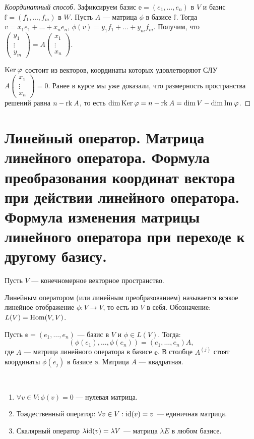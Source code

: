 \begin{proof}[Координатный способ]
    Зафиксируем базис $\mathbb{e} = (e_1, \ldots, e_n)$ в $V$ и базис $\mathbb{f} = (f_1, \ldots, f_m)$ в $W$. Пусть $A$ --- матрица $\phi$ в базисе $\mathbb{f}$. Тогда $v = x_1e_1 + \ldots + x_ne_n$, $\phi(v) = y_1f_1 + \ldots + y_mf_m$. Получим, что $\begin{pmatrix} y_1\\ \vdots \\ y_m \end{pmatrix} = A \begin{pmatrix} x_1\\ \vdots \\ x_n\end{pmatrix}$. 
    
    $\mathrm{Ker}\: \varphi$ состоит из векторов, координаты которых удовлетворяют СЛУ $ A \begin{pmatrix} x_1\\ \vdots \\ x_n\end{pmatrix} = 0$. Ранее в курсе мы уже доказали, что размерность пространства решений равна $n - \mathrm{rk}\: A$, то есть $\dim \mathrm{Ker}\: \varphi = n - \mathrm{rk}\: A = \dim V - \dim \mathrm{Im\:} \varphi$.
\end{proof}

\section{Линейный оператор. Матрица линейного оператора. Формула преобразования координат вектора при действии линейного оператора. Формула изменения матрицы линейного оператора при переходе к другому базису.}

Пусть $V$ --- конечномерное векторное пространство.

\begin{Def}
    Линейным оператором (или линейным преобразованием) называется всякое линейное отображение $\phi \colon V \rightarrow V$, то есть из $V$ в себя. Обозначение: $L(V) = \mathrm{Hom}(V, V)$.
\end{Def}

\par Пусть $\mathbb{e} = (e_1, \ldots, e_n)$ --- базис в $V$ и $\phi \in L(V)$. Тогда:
$$
\left(\phi(e_1), \ldots, \phi(e_n)\right) = \left(e_1, \ldots, e_n\right)A,
$$
где $A$ --- матрица линейного оператора в базисе $\mathbb{e}$. В столбце $A^{\left( j\right)}$ стоят координаты $\phi(e_j)$ в базисе $\mathbb{e}$. Матрица $A$ --- квадратная. 
\begin{Examples}\
    \begin{enumerate}
        \item $\forall v \in V : \phi(v) = 0$ --- нулевая матрица.
        \item Тождественный оператор: $\forall v \in V : \mathrm{id}(v) = v$ --- единичная матрица.
        \item Скалярный оператор $\lambda \mathrm{id}(v) = \lambda V$ --- матрица $\lambda E$ в любом базисе.
    \end{enumerate}
\end{Examples}


